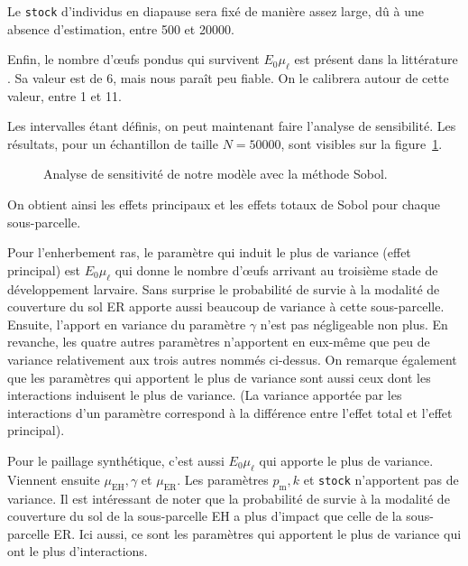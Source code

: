 Le \texttt{stock} d'individus en diapause sera fixé de manière assez large, dû à une absence d'estimation, entre 500 et 20000.

Enfin, le nombre d'œufs pondus qui survivent $E_0\mu_\ell$ est présent dans la littérature \citep{paul}.
Sa valeur est de 6, mais nous paraît peu fiable.
On le calibrera autour de cette valeur, entre 1 et 11.

Les intervalles étant définis, on peut maintenant faire l'analyse de sensibilité. Les résultats, pour un échantillon de taille $N = 50000$, sont visibles sur la figure~\ref{fig:sa}.

\begin{figure}
 \centering
 \caption{Analyse de sensitivité de notre modèle avec la méthode Sobol.}
 \label{fig:sa}
\end{figure}

On obtient ainsi les effets principaux et les effets totaux de Sobol pour chaque sous-parcelle.

Pour l'enherbement ras, le paramètre qui induit le plus de variance (effet principal) est $E_0\mu_\ell$ qui donne le nombre d'œufs arrivant au troisième stade de développement larvaire.
Sans surprise le probabilité de survie à la modalité de couverture du sol ER apporte aussi beaucoup de variance à cette sous-parcelle.
Ensuite, l'apport en variance du paramètre $\gamma$ n'est pas négligeable non plus.
En revanche, les quatre autres paramètres n'apportent en eux-même que peu de variance relativement aux trois autres nommés ci-dessus.
On remarque également que les paramètres qui apportent le plus de variance sont aussi ceux dont les interactions induisent le plus de variance.
(La variance apportée par les interactions d'un paramètre correspond à la différence entre l'effet total et l'effet principal).

Pour le paillage synthétique, c'est aussi $E_0\mu_\ell$ qui apporte le plus de variance.
Viennent ensuite $\mu_{\text{EH}}, \gamma$ et $\mu_{\text{ER}}$.
Les paramètres $p_{\text{m}}, k$ et \texttt{stock} n'apportent pas de variance.
Il est intéressant de noter que la probabilité de survie à la modalité de couverture du sol de la sous-parcelle EH a plus d'impact que celle de la sous-parcelle ER.
Ici aussi, ce sont les paramètres qui apportent le plus de variance qui ont le plus d'interactions.

